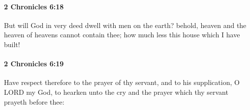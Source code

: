 		\paragraph{2 Chronicles 6:18} %
			\label{2CHRONICLES-6-18}

			But will God in very deed dwell with men on the earth? behold, heaven and the heaven of heavens cannot contain thee; how much less this house which I have built!


		\paragraph{2 Chronicles 6:19} %
			\label{2CHRONICLES-6-19}

			Have respect therefore to the prayer of thy servant, and to his supplication, O LORD my God, to hearken unto the cry and the prayer which thy servant prayeth before thee:


